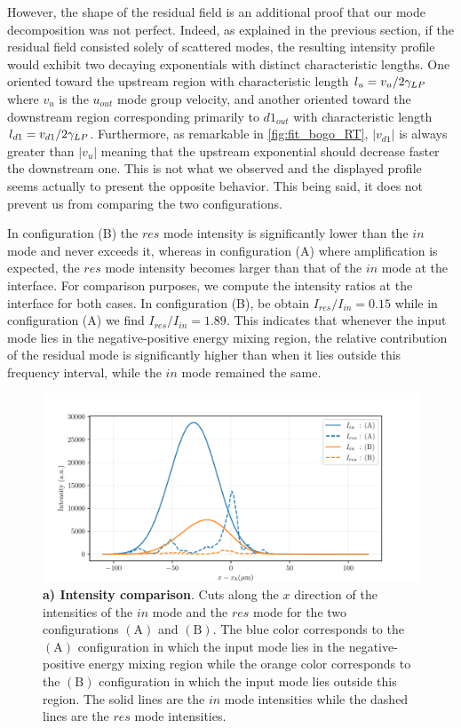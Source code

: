 However, the shape of the residual field is an additional proof that our mode decomposition was not perfect. Indeed, as explained in the previous section, if the residual field consisted solely of scattered modes, the resulting intensity profile would exhibit two decaying exponentials with distinct characteristic lengths.
One oriented toward the upstream region with characteristic length $l_u=v_u/2\gamma_{LP}$ where $v_u$ is the $u_{out}$ mode group velocity, and another oriented toward the downstream region corresponding primarily to $d1_{out}$ with characteristic length $l_{d1}=v_{d1}/2\gamma_{LP}$. Furthermore, as remarkable in \autoref{fig:fit_bogo_RT}, $|v_{d1}|$ is always greater than $|v_u|$ meaning that the upstream exponential should decrease faster the downstream one. This is not what we observed and the displayed profile seems actually to present the opposite behavior.
This being said, it does not prevent us from comparing the two configurations.


In configuration (B) the $res$ mode intensity is significantly lower than the $in$ mode and never exceeds it, whereas in configuration (A) where amplification is expected, the $res$ mode intensity becomes larger than that of the $in$ mode at the interface.
For comparison purposes, we compute the intensity ratios at the interface for both cases. In configuration (B), be obtain $I_{res}/I_{in} = 0.15$ while in configuration (A) we find $I_{res}/I_{in} = 1.89$. This indicates that whenever the input mode lies in the negative-positive energy mixing region, the relative contribution of the residual mode
is significantly higher than when it lies outside this frequency interval, while the $in$ mode remained the same. 

\begin{figure}
    \centering
    \includegraphics[width=1\textwidth]{chap_stimulated_hawking/fig/intensity_comparison.pdf}
    \caption{\textbf{a) Intensity comparison}. Cuts along the $x$ direction of the intensities of the $in$ mode and the $res$ mode for the two configurations $\mathrm{(A)}$ and $\mathrm{(B)}$.
    The blue color corresponds to the $\mathrm{(A)}$ configuration in which the input mode lies in the negative-positive energy mixing region while the orange color corresponds to the $\mathrm{(B)}$ configuration in which the input mode lies outside this region.
    The solid lines are the $in$ mode intensities while the dashed lines are the $res$ mode intensities.}
    \label{fig:intensity_comparison}
\end{figure}

